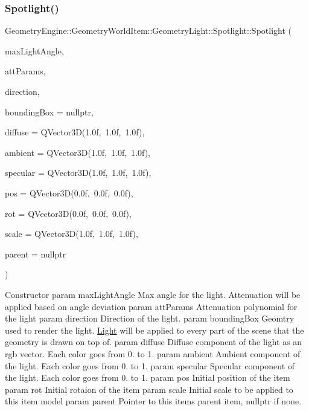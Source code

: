 \subsubsection{\texorpdfstring{Spotlight()}{Spotlight()}}
{\footnotesize\ttfamily Geometry\+Engine\+::\+Geometry\+World\+Item\+::\+Geometry\+Light\+::\+Spotlight\+::\+Spotlight (\begin{DoxyParamCaption}\item[{float}]{max\+Light\+Angle,  }\item[{const Q\+Vector3D \&}]{att\+Params,  }\item[{const Q\+Vector3D \&}]{direction,  }\item[{\mbox{\hyperlink{class_geometry_engine_1_1_geometry_world_item_1_1_geometry_item_1_1_geometry_item}{Geometry\+Item\+::\+Geometry\+Item}} $\ast$}]{bounding\+Box = {\ttfamily nullptr},  }\item[{const Q\+Vector3D \&}]{diffuse = {\ttfamily QVector3D(1.0f,~1.0f,~1.0f)},  }\item[{const Q\+Vector3D \&}]{ambient = {\ttfamily QVector3D(1.0f,~1.0f,~1.0f)},  }\item[{const Q\+Vector3D \&}]{specular = {\ttfamily QVector3D(1.0f,~1.0f,~1.0f)},  }\item[{const Q\+Vector3D \&}]{pos = {\ttfamily QVector3D(0.0f,~0.0f,~0.0f)},  }\item[{const Q\+Vector3D \&}]{rot = {\ttfamily QVector3D(0.0f,~0.0f,~0.0f)},  }\item[{const Q\+Vector3D \&}]{scale = {\ttfamily QVector3D(1.0f,~1.0f,~1.0f)},  }\item[{\mbox{\hyperlink{class_geometry_engine_1_1_geometry_world_item_1_1_world_item}{World\+Item}} $\ast$}]{parent = {\ttfamily nullptr} }\end{DoxyParamCaption})}

Constructor param max\+Light\+Angle Max angle for the light. Attenuation will be applied based on angle deviation param att\+Params Attenuation polynomial for the light param direction Direction of the light. param bounding\+Box Geomtry used to render the light. \mbox{\hyperlink{class_geometry_engine_1_1_geometry_world_item_1_1_geometry_light_1_1_light}{Light}} will be applied to every part of the scene that the geometry is drawn on top of. param diffuse Diffuse component of the light as an rgb vector. Each color goes from 0. to 1. param ambient Ambient component of the light. Each color goes from 0. to 1. param specular Specular component of the light. Each color goes from 0. to 1. param pos Initial position of the item param rot Initial rotaion of the item param scale Initial scale to be applied to this item model param parent Pointer to this items parent item, nullptr if none. 

